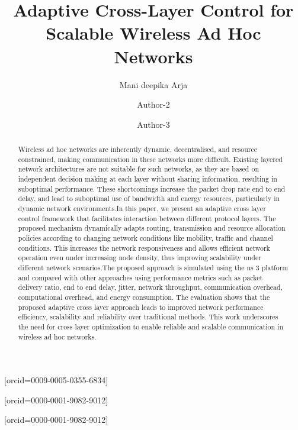\documentclass[a4paper,fleqn,final,1p]{cas-dc}
\numberwithin{equation}{section}
\begin{document}
\AtBeginDocument{
\AtBeginShipoutNext{\AtBeginShipoutDiscard}
}
\renewcommand{\floatpagefraction}{0.8}
\renewcommand{\textfraction}{0.1}
\renewcommand{\topfraction}{0.9}
\renewcommand{\bottomfraction}{0.8}
\makeatletter
\let\ps@pprintTitle\ps@plain
\makeatother
{}


\title [mode = title]{Adaptive Cross-Layer Control for Scalable Wireless Ad Hoc Networks} 




\author[1]{Mani deepika Arja}[orcid=0009-0005-0355-6834]
\address[1]{School of Computer Science and Engineering, VIT-AP University, Amaravathi. Andhra Pradesh, India}

\author[1]{Author-2} [orcid=0000-0001-9082-9012]
\cormark[1]

\author[3]{Author-3} [orcid=0000-0001-9082-9012]


\begin{abstract}
Wireless ad hoc networks are inherently dynamic, decentralised, and resource constrained, making communication in these networks more difficult. Existing layered network architectures are not suitable for such networks, as they are based on independent decision making at each layer without sharing information, resulting in suboptimal performance. These shortcomings increase the packet drop rate end to end delay, and lead to suboptimal use of bandwidth and energy resources, particularly in dynamic network environments.In this paper, we present an adaptive cross layer control framework that facilitates interaction between different protocol layers. The proposed mechanism dynamically adapts routing, transmission and resource allocation policies according to changing network conditions like mobility, traffic and channel conditions. This increases the network responsiveness and allows efficient network operation even under increasing node density, thus improving scalability under different network scenarios.The proposed approach is simulated using the ns 3 platform and compared with other approaches using performance metrics such as packet delivery ratio, end to end delay, jitter, network throughput, communication overhead, computational overhead, and energy consumption. The evaluation shows that the proposed adaptive cross layer approach leads to improved network performance efficiency, scalability and reliability over traditional methods. This work underscores the need for cross layer optimization to enable reliable and scalable communication in wireless ad hoc networks.
\end{abstract}
\end{document}
